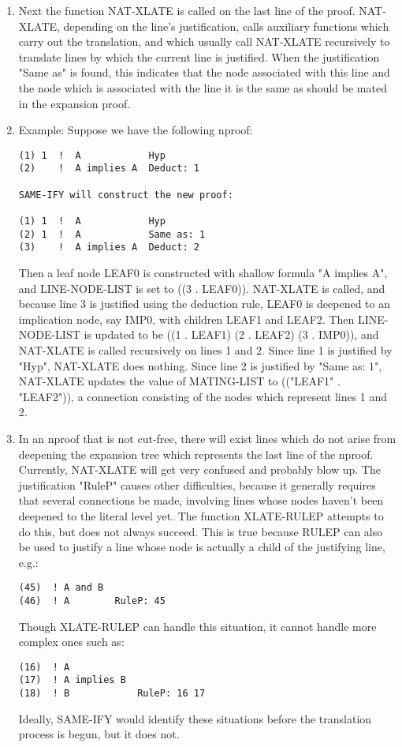 \begin{enumerate}
\item Next the function NAT-XLATE is called on the last line of the
proof.  NAT-XLATE, depending on the line's justification, calls
auxiliary functions which carry out the translation, and which usually
call NAT-XLATE recursively to translate lines by which the current
line is justified.  When the justification "Same as" is found, this
indicates that the node associated with this line and the node which
is associated with the line it is the same as should be mated in the
expansion proof.

\item Example:  Suppose we have the following nproof:
\begin{verbatim}
(1) 1  !  A            Hyp
(2)    !  A implies A  Deduct: 1

SAME-IFY will construct the new proof:

(1) 1  !  A            Hyp
(2) 1  !  A            Same as: 1 
(3)    !  A implies A  Deduct: 2
\end{verbatim}

Then a leaf node LEAF0 is constructed with shallow formula 
"A implies A", and LINE-NODE-LIST is set to ((3 . LEAF0)). 
NAT-XLATE is called, and because line 3 is justified using the
deduction rule, LEAF0 is deepened to an implication node, say IMP0,
with children LEAF1 and LEAF2.  Then LINE-NODE-LIST is updated to be
((1 . LEAF1) (2 . LEAF2) (3 . IMP0)), and NAT-XLATE is called
recursively on lines 1 and 2.  Since line 1 is justified by "Hyp",
NAT-XLATE does nothing.  Since line 2 is justified by "Same as: 1",
NAT-XLATE updates the value of MATING-LIST to (("LEAF1" . "LEAF2")), a
connection consisting of the nodes which represent lines 1 and 2.

\item In an nproof that is not cut-free, there will exist lines which do
not arise from deepening the expansion tree which represents the last
line of the nproof.  Currently, NAT-XLATE will get very confused and
probably blow up.  The justification "RuleP" causes other
difficulties, because it generally requires that several connections
be made, involving lines whose nodes haven't been deepened to the
literal level yet.  The function XLATE-RULEP attempts to do this, but
does not always succeed.  This is true because RULEP can also be used
to justify a line whose node is actually a child of the justifying
line, e.g.: 
\begin{verbatim}
(45)  ! A and B 
(46)  ! A        RuleP: 45
\end{verbatim}
Though XLATE-RULEP can handle this situation, it cannot handle more
complex ones such as:
\begin{verbatim}
(16)  ! A
(17)  ! A implies B
(18)  ! B            RuleP: 16 17
\end{verbatim}
Ideally, SAME-IFY would identify these situations before the
translation process is begun, but it does not.
\end{enumerate}

